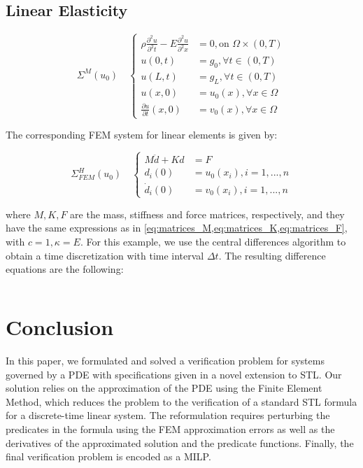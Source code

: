 \documentclass[oribibl]{llncs/llncs}
\begin{document}
\subsection{Linear Elasticity}
\label{sub:linear_elasticity}

\begin{equation}\label{eq:pde_mech}
    \Sigma^{M}(u_0) \quad \left \{
    \begin{aligned}
        \rho \frac{\partial^2 u}{\partial^2 t} - E \frac{\partial^2
        u}{\partial^2 x} &= 0, \text{on } \Omega \times (0, T) \\
        u(0, t) &= g_0, \forall t \in (0, T) \\
        u(L, t) &= g_L, \forall t \in (0, T) \\
        u(x, 0) &= u_0(x), \forall x \in \Omega \\
        \frac{\partial u}{\partial t}(x, 0) &= v_0(x), \forall x \in \Omega
    \end{aligned}
    \right.
\end{equation}

The corresponding FEM system for linear elements is given by:

\begin{equation}\label{eq:fem_mech}
    \Sigma^H_{FEM}(u_0) \quad \left \{
    \begin{aligned}
        M\ddot{d} + K d &= F \\
        d_i(0) &= u_0(x_i), i = 1,...,n \\
        \dot{d}_i(0) &= v_0(x_i), i = 1,...,n
    \end{aligned}
    \right.
\end{equation}

where $M, K, F$ are the mass, stiffness and force matrices, respectively, and
they have the same expressions as in
\cref{eq:matrices_M,eq:matrices_K,eq:matrices_F}, with $c = 1, \kappa = E$.
For this example, we use the central differences algorithm to obtain a time
discretization with time interval $\Delta t$. The resulting difference equations
are the following:

\begin{equation}
\end{equation}

\section{Conclusion}
\label{sec:conclusion}

In this paper, we formulated and solved a verification problem for systems governed by a
PDE with specifications given in a novel extension to STL. Our solution relies
on the approximation of the PDE using the Finite Element Method, which reduces
the problem to the verification of a standard STL formula for a discrete-time
linear system. The reformulation requires perturbing the predicates in the
formula using the FEM approximation errors as well as the derivatives of the
approximated solution and the predicate functions. Finally, the final
verification problem is encoded as a MILP.
\end{document}
